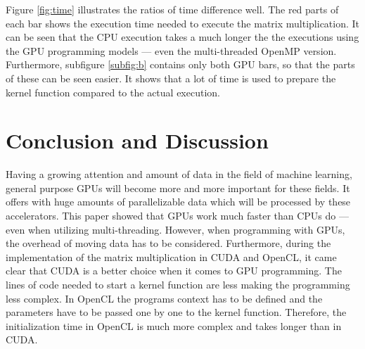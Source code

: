 \documentclass[a4paper,12pt]{llncs}
\numberwithin{equation}{section}
\begin{document}
Figure \ref{fig:time} illustrates the ratios of time difference well.
The red parts of each bar shows the execution time needed to execute the matrix multiplication.
It can be seen that the CPU execution takes a much longer the the executions using the GPU programming models --- even the multi-threaded OpenMP version.
Furthermore, subfigure \ref{subfig:b} contains only both GPU bars, so that the parts of these can be seen easier.
It shows that a lot of time is used to prepare the kernel function compared to the actual execution.


\section{Conclusion and Discussion}
Having a growing attention and amount of data in the field of machine learning, general purpose GPUs will become more and more important for these fields.
It offers with huge amounts of parallelizable data which will be processed by these accelerators.
This paper showed that GPUs work much faster than CPUs do --- even when utilizing multi-threading.
However, when programming with GPUs, the overhead of moving data has to be considered.
Furthermore, during the implementation of the matrix multiplication in CUDA and OpenCL, it came clear that CUDA is a better choice when it comes to GPU programming.
The lines of code needed to start a kernel function are less making the programming less complex.
In OpenCL the programs context has to be defined and the parameters have to be passed one by one to the kernel function.
Therefore, the initialization time in OpenCL is much more complex and takes longer than in CUDA.


\newpage



\end{document}

